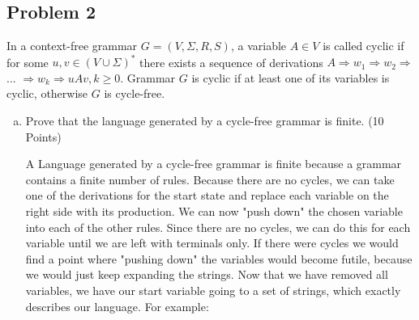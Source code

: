 \documentclass{article}
\begin{document}
\subsection*{Problem 2}
In a context-free grammar $G = (V, \Sigma, R, S)$, a variable $A \in V$ is called cyclic if for some $u,v \in
(V \cup \Sigma)^*$ there exists a sequence of derivations $A \Rightarrow w_1 \Rightarrow w_2 \Rightarrow$ ... 
$ \Rightarrow w_k \Rightarrow uAv,k \geq 0$. Grammar $G$ is cyclic if at least one of its variables is cyclic,
otherwise $G$ is cycle-free.
\begin{enumerate}[(a)]
\item Prove that the language generated by a cycle-free grammar is finite. (10 Points)

A Language generated by a cycle-free grammar is finite because a grammar contains a finite
number of rules. Because there are no cycles, we can take one of the derivations for the start state
and replace each variable on the right side with its production. We can now "push down" the chosen
variable into each of the other rules. Since there are no cycles, we can do this for each variable
until we are left with terminals only. If there were cycles we would find a point where "pushing
down" the variables would become futile, because we would just keep expanding the strings. Now
that we have removed all variables, we have our start variable going to a set of strings, which
exactly describes our language. For example: \\


\end{enumerate}
\end{document}
